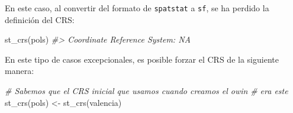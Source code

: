 \documentclass[
]{book}
\newenvironment{Shaded}{\begin{snugshade}}{\end{snugshade}}
\newcommand{\CommentTok}[1]{\textcolor[rgb]{0.56,0.35,0.01}{\textit{#1}}}
\newcommand{\FunctionTok}[1]{\textcolor[rgb]{0.00,0.00,0.00}{#1}}
\newcommand{\NormalTok}[1]{#1}
\newcommand{\OtherTok}[1]{\textcolor[rgb]{0.56,0.35,0.01}{#1}}
\theoremstyle{definition}
\theoremstyle{definition}
\theoremstyle{definition}
\theoremstyle{definition}
\theoremstyle{remark}
\begin{document}
En este caso, al convertir del formato de \texttt{spatstat} a \texttt{sf}, se ha perdido la
definición del CRS:

\begin{Shaded}
\begin{Highlighting}[]
\FunctionTok{st\_crs}\NormalTok{(pols)}
\CommentTok{\#\textgreater{} Coordinate Reference System: NA}
\end{Highlighting}
\end{Shaded}

En este tipo de casos excepcionales, es posible forzar el CRS de la siguiente
manera:

\begin{Shaded}
\begin{Highlighting}[]
\CommentTok{\# Sabemos que el CRS inicial que usamos cuando creamos el owin}
\CommentTok{\# era este}
\FunctionTok{st\_crs}\NormalTok{(pols) }\OtherTok{\textless{}{-}} \FunctionTok{st\_crs}\NormalTok{(valencia)}


\end{Highlighting}
\end{Shaded}
\end{document}
